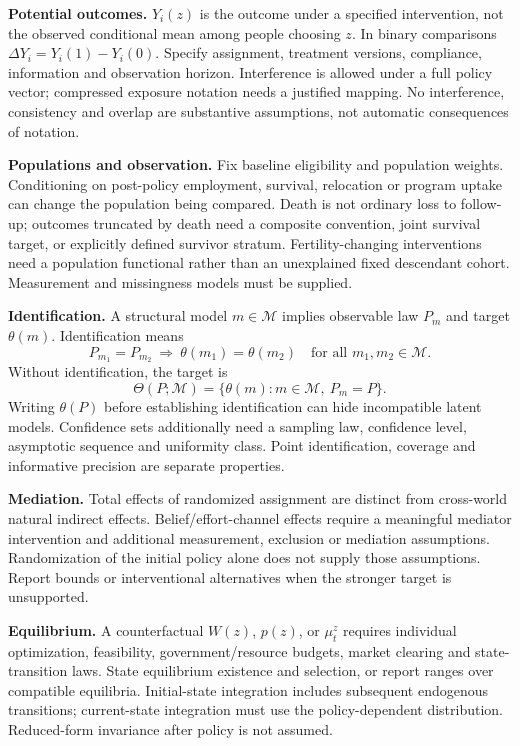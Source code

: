 \documentclass[11pt,a4paper]{article}
\begin{document}
\textbf{Potential outcomes.} \(Y_i(z)\) is the outcome under a specified intervention, not the observed conditional mean among people choosing \(z\). In binary comparisons \(\Delta Y_i=Y_i(1)-Y_i(0)\). Specify assignment, treatment versions, compliance, information and observation horizon. Interference is allowed under a full policy vector; compressed exposure notation needs a justified mapping. No interference, consistency and overlap are substantive assumptions, not automatic consequences of notation.

\textbf{Populations and observation.} Fix baseline eligibility and population weights. Conditioning on post-policy employment, survival, relocation or program uptake can change the population being compared. Death is not ordinary loss to follow-up; outcomes truncated by death need a composite convention, joint survival target, or explicitly defined survivor stratum. Fertility-changing interventions need a population functional rather than an unexplained fixed descendant cohort. Measurement and missingness models must be supplied.

\textbf{Identification.} A structural model \(m\in\mathcal M\) implies observable law \(P_m\) and target \(\theta(m)\). Identification means
\[
 P_{m_1}=P_{m_2}\ \Longrightarrow\ \theta(m_1)=\theta(m_2)
 \quad\text{for all }m_1,m_2\in\mathcal M .
\]
Without identification, the target is
\[
 \Theta(P;\mathcal M)=\{\theta(m):m\in\mathcal M,\ P_m=P\}.
\]
Writing \(\theta(P)\) before establishing identification can hide incompatible latent models. Confidence sets additionally need a sampling law, confidence level, asymptotic sequence and uniformity class. Point identification, coverage and informative precision are separate properties.

\textbf{Mediation.} Total effects of randomized assignment are distinct from cross-world natural indirect effects. Belief/effort-channel effects require a meaningful mediator intervention and additional measurement, exclusion or mediation assumptions. Randomization of the initial policy alone does not supply those assumptions. Report bounds or interventional alternatives when the stronger target is unsupported.

\textbf{Equilibrium.} A counterfactual \(W(z)\), \(p(z)\), or \(\mu_t^z\) requires individual optimization, feasibility, government/resource budgets, market clearing and state-transition laws. State equilibrium existence and selection, or report ranges over compatible equilibria. Initial-state integration includes subsequent endogenous transitions; current-state integration must use the policy-dependent distribution. Reduced-form invariance after policy is not assumed.
\end{document}
